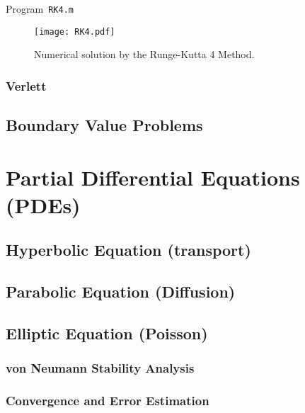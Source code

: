 \begin{listing}[ht!]
	\tiny
	\centering
	\caption{Program~\texttt{RK4.m}}
	\label{code:RK2.m}
\end{listing}

\begin{figure}[ht!]
	\centering
	\texttt{[image: RK4.pdf]}
	\caption{Numerical solution by the Runge-Kutta 4 Method.}
\end{figure}

\subsubsection{Verlett}

\subsection{Boundary Value Problems}

\section{Partial Differential Equations (PDEs)}

\subsection{Hyperbolic Equation (transport)}

\subsection{Parabolic Equation (Diffusion)}

\subsection{Elliptic Equation (Poisson)}

\subsubsection{von Neumann Stability Analysis}

\subsubsection{Convergence and Error Estimation}
